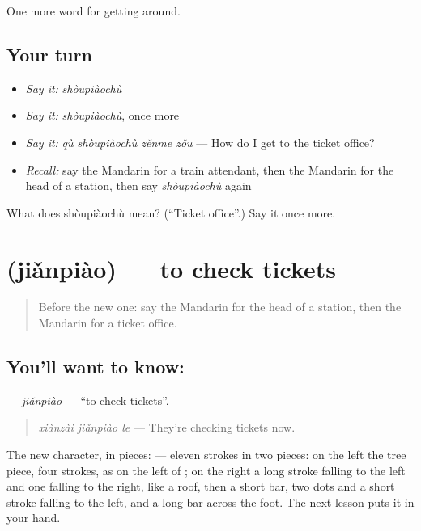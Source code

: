 \begin{grammarlens}[title={What you've built}]
One more word for getting around.
\end{grammarlens}

\subsection*{Your turn}
\begin{itemize}
\raggedright
  \item \emph{Say it:} \emph{shòupiàochù}
  \item \emph{Say it:} \emph{shòupiàochù}, once more
  \item \emph{Say it:} \emph{qù shòupiàochù zěnme zǒu} — How do I get to the ticket office?
  \item \emph{Recall:} say the Mandarin for a train attendant, then the Mandarin for the head of a station, then say \emph{shòupiàochù} again
\end{itemize}

\begin{tcolorbox}[breakable,colback=teal!4,colframe=teal!35!black,title={Before you move on}]
What does shòupiàochù mean? (\textquotedblleft{}Ticket office\textquotedblright{}.) Say it once more.
\end{tcolorbox}
\section[\texorpdfstring{\zh{检票} (jiǎnpiào)}{检票 (jiǎnpiào)}]{ (jiǎnpiào) — to check tickets}

\label{lesson:ZH-C404-jianpiao}



\begin{quote}
Before the new one: say the Mandarin for the head of a station, then the Mandarin for a ticket office.
\end{quote}

\subsection*{You'll want to know: }
\textbf{} — \emph{jiǎnpiào} — \textquotedblleft{}to check tickets\textquotedblright{}.

\begin{quote}
\textbf{} \emph{xiànzài jiǎnpiào le} — They're checking tickets now.
\end{quote}

The new character, in pieces:  — eleven strokes in two pieces: on the left the tree piece, four strokes, as on the left of ; on the right a long stroke falling to the left and one falling to the right, like a roof, then a short bar, two dots and a short stroke falling to the left, and a long bar across the foot. The next lesson puts it in your hand.

